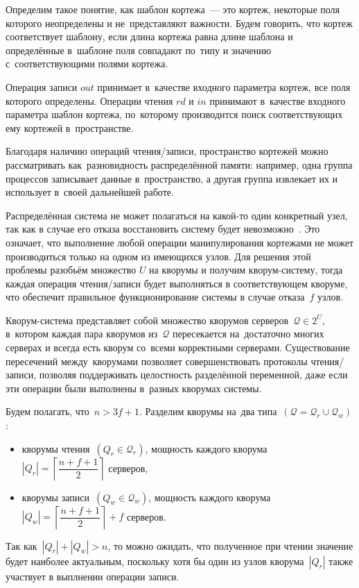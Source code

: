 Определим такое понятие, как шаблон кортежа~--- это кортеж, некоторые поля которого неопределены и не~представляют важности. Будем говорить, что кортеж соответствует шаблону, если длина кортежа равна длине шаблона и определённые в~шаблоне поля совпадают по~типу и значению с~соответствующими полями кортежа.

Операция записи $out$ принимает в~качестве входного параметра кортеж, все поля которого определены. Операции чтения $rd$ и $in$ принимают в~качестве входного параметра шаблон кортежа, по~которому производится поиск соответствующих ему кортежей в~пространстве.

Благодаря наличию операций чтения/записи, пространство кортежей можно рассматривать как~разновидность распределённой памяти: например, одна группа процессов записывает данные в~пространство, а другая группа извлекает их и использует в~своей дальнейшей работе.

Распределённая система не может полагаться на какой-то один конкретный узел, так как в случае его отказа восстановить систему будет невозможно~\autocite{Kleppman}. Это означает, что выполнение любой операции манипулирования кортежами не может производиться только на одном из имеющихся узлов. Для решения этой проблемы разобьём множество $U$ на кворумы и получим кворум-систему, тогда каждая операция чтения/записи будет выполняться в соответствующем кворуме, что обеспечит правильное функционирование системы в случае отказа~$f$ узлов.

Кворум-система представляет собой множество кворумов серверов~$\mathcal{Q} \in 2^{U}$, в~котором каждая пара кворумов из~$\mathcal{Q}$ пересекается на~достаточно многих серверах и всегда есть кворум со~всеми корректными серверами. Существование пересечений между~кворумами позволяет совершенствовать протоколы чтения/записи, позволяя поддерживать целостность разделённой переменной, даже если эти операции были выполнены в~разных кворумах системы.

Будем полагать, что~$n > 3f + 1$. Разделим кворумы на~два типа~$(\mathcal{Q} = \mathcal{Q}_r \cup \mathcal{Q}_w)$:
\begin{itemize}
	\item кворумы чтения~$(Q_r \in \mathcal{Q}_r)$, мощность каждого кворума ~$|Q_r| = \left\lceil \dfrac{n+f+1}{2} \right\rceil$ серверов,
	\item кворумы записи~$(Q_w \in \mathcal{Q}_w)$, мощность каждого кворума~$|Q_w| = \left\lceil \dfrac{n+f+1}{2} \right\rceil + f$ серверов.
\end{itemize}
Так как~$|Q_r| + |Q_w| > n$, то можно ожидать, что полученное при чтении значение  будет наиболее актуальным, поскольку хотя бы один из узлов кворума~$|Q_r|$ также участвует в выплнении операции записи.


